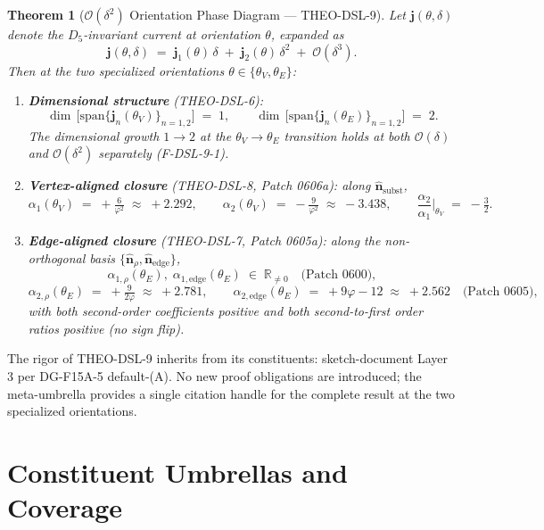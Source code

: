 \documentclass[11pt]{article}
\newtheorem{theorem}{Theorem}
\begin{document}
\begin{theorem}[$\mathcal{O}(\delta^2)$ Orientation Phase Diagram --- THEO-DSL-9]
\label{thm:THEO-DSL-9}
Let $\mathbf{j}(\theta, \delta)$ denote the $D_5$-invariant current at
orientation $\theta$, expanded as
\[
\mathbf{j}(\theta, \delta) \;=\; \mathbf{j}_1(\theta)\,\delta
\;+\; \mathbf{j}_2(\theta)\,\delta^2 \;+\; \mathcal{O}(\delta^3).
\]
Then at the two specialized orientations $\theta \in \{\theta_V, \theta_E\}$:
\begin{enumerate}
\item[\textnormal{(i)}] \textbf{Dimensional structure} (THEO-DSL-6):
\[
\dim\,\bigl[\mathrm{span}\{\mathbf{j}_n(\theta_V)\}_{n=1,2}\bigr] \;=\; 1,
\qquad
\dim\,\bigl[\mathrm{span}\{\mathbf{j}_n(\theta_E)\}_{n=1,2}\bigr] \;=\; 2.
\]
The dimensional growth $1 \to 2$ at the $\theta_V \to \theta_E$
transition holds at \emph{both} $\mathcal{O}(\delta)$ and
$\mathcal{O}(\delta^2)$ separately (F-DSL-9-1).

\item[\textnormal{(ii)}] \textbf{Vertex-aligned closure} (THEO-DSL-8,
Patch 0606a): along $\hat{\mathbf{n}}_{\text{subst}}$,
\[
\alpha_1(\theta_V) \;=\; +\tfrac{6}{\varphi^2} \;\approx\; +2.292,
\qquad
\alpha_2(\theta_V) \;=\; -\tfrac{9}{\varphi^2} \;\approx\; -3.438,
\qquad
\frac{\alpha_2}{\alpha_1}\bigg|_{\theta_V} \;=\; -\tfrac{3}{2}.
\]

\item[\textnormal{(iii)}] \textbf{Edge-aligned closure} (THEO-DSL-7,
Patch 0605a): along the non-orthogonal basis
$\{\hat{\mathbf{n}}_\rho, \hat{\mathbf{n}}_{\text{edge}}\}$,
\[
\alpha_{1,\rho}(\theta_E),\; \alpha_{1,\text{edge}}(\theta_E)
\;\in\; \mathbb{R}_{\neq 0}
\quad\text{(Patch 0600)},
\]
\[
\alpha_{2,\rho}(\theta_E) \;=\; +\tfrac{9}{2\varphi} \;\approx\; +2.781,
\qquad
\alpha_{2,\text{edge}}(\theta_E) \;=\; +9\varphi-12 \;\approx\; +2.562
\quad\text{(Patch 0605)},
\]
with both second-order coefficients positive and both second-to-first
order ratios positive (no sign flip).
\end{enumerate}
\end{theorem}

\medskip
The rigor of THEO-DSL-9 inherits from its constituents: sketch-document
Layer 3 per DG-F15A-5 default-(A). No new proof obligations are
introduced; the meta-umbrella provides a single citation handle for the
complete result at the two specialized orientations.

\section{Constituent Umbrellas and Coverage}
\end{document}
